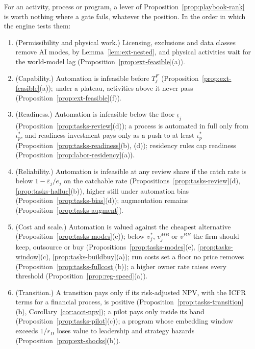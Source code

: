 \begin{proposition}\label{prop:playbook-gates}
For an activity, process or program, a lever of Proposition~\ref{prop:playbook-rank} is worth nothing where a gate fails, whatever the position. In the order in which the engine tests them:
\begin{enumerate}
\item[(a)] (Permissibility and physical work.) Licensing, exclusions and data classes remove AI modes, by Lemma~\ref{lem:ext-nested}, and physical activities wait for the world-model lag (Proposition~\ref{prop:ext-feasible}(a)).
\item[(b)] (Capability.) Automation is infeasible before $T^F_j$ (Proposition~\ref{prop:ext-feasible}(a)); under a plateau, activities above it never pass (Proposition~\ref{prop:ext-feasible}(f)).
\item[(c)] (Readiness.) Automation is infeasible below the floor $\underline\iota_j$ (Proposition~\ref{prop:tasks-review}(d)); a process is automated in full only from $\iota^*_p$, and readiness investment pays only as a push to at least $\iota^*_p$ (Proposition~\ref{prop:tasks-readiness}(b), (d)); residency rules cap readiness (Proposition~\ref{prop:labor-residency}(a)).
\item[(d)] (Reliability.) Automation is infeasible at any review share if the catch rate is below $1-\bar\varepsilon_j/e_j$ on the catchable rate (Propositions~\ref{prop:tasks-review}(d), \ref{prop:tasks-halluc}(b)), higher still under automation bias (Proposition~\ref{prop:tasks-bias}(d)); augmentation remains (Proposition~\ref{prop:tasks-augment}).
\item[(e)] (Cost and scale.) Automation is valued against the cheapest alternative (Proposition~\ref{prop:tasks-modes}(c)); below $v^*_j$, $v^{MB}_j$ or $v^{BB}$ the firm should keep, outsource or buy (Propositions~\ref{prop:tasks-modes}(e), \ref{prop:tasks-window}(c), \ref{prop:tasks-buildbuy}(a)); run costs set a floor no price removes (Proposition~\ref{prop:tasks-fullcost}(b)); a higher owner rate raises every threshold (Proposition~\ref{prop:reg-speed}(a)).
\item[(f)] (Transition.) A transition pays only if its risk-adjusted NPV, with the ICFR terms for a financial process, is positive (Proposition~\ref{prop:tasks-transition}(b), Corollary~\ref{cor:acct-npv}); a pilot pays only inside its band (Proposition~\ref{prop:tasks-pilot}(c)); a program whose embedding window exceeds $1/r_D$ loses value to leadership and strategy hazards (Proposition~\ref{prop:ext-shocks}(b)).

\end{enumerate}
\end{proposition}
